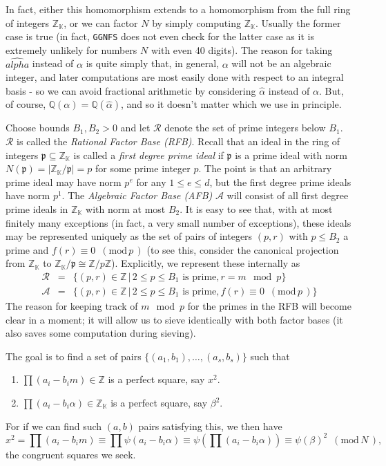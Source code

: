 \documentclass[12pt]{article}
\newcommand{\K}{\mathbb{K}}
\newcommand{\Z}{\mathbb{Z}}
\newcommand{\Q}{\mathbb{Q}}
\newcommand{\rfb}{\mathcal{R}}
\newcommand{\afb}{\mathcal{A}}
\newcommand{\p}{\mathfrak{p}}
\newcommand{\md}[1]{\,\,\, ( \mathrm{mod}\, #1 \,) }
\begin{document}
  In fact, either this homomorphism extends to a homomorphism
  from the full ring of integers $\Z_\K$, or we can factor
  $N$ by simply computing $\Z_\K$. Usually the former case is
  true (in fact, {\tt GGNFS} does not even check for the latter
  case as it is extremely unlikely for numbers $N$ with even 40
  digits). The reason for taking $\hat{alpha}$ instead of $\alpha$
  is quite simply that, in general, $\alpha$ will not be an algebraic
  integer, and later computations are most easily done with respect
  to an integral basis - so we can avoid fractional arithmetic
  by considering $\hat{\alpha}$ instead of $\alpha$.
  But, of course, $\Q(\alpha)=\Q(\hat{\alpha})$, and so it doesn't
  matter which we use in principle.



  Choose bounds $B_1, B_2 > 0$ and let $\rfb$ denote the set
  of prime integers below $B_1$. $\rfb$ is called the 
  {\em Rational Factor Base (RFB)}. Recall that an ideal
  in the ring of integers $\p\subseteq \Z_\K$ is called
  a {\em first degree prime ideal} if $\p$ is a prime
  ideal with norm $N(\p) = \vert \Z_\K/\p \vert = p$ for some
  prime integer $p$. The point is that an arbitrary prime
  ideal may have norm $p^e$ for any $1\le e\le d$, but the
  first degree prime ideals have norm $p^1$. The 
  {\em Algebraic Factor Base (AFB)} $\afb$ will consist of
  all first degree prime ideals in $\Z_\K$ with norm at most
  $B_2$. It is easy to see that, with at most finitely many exceptions
  (in fact, a very small number of exceptions), these ideals
  may be represented uniquely as the set of pairs of integers
  $(p,r)$ with $p\le B_2$ a prime and $f(r)\equiv 0\md{p}$
  (to see this, consider the canonical projection from
  $\Z_\K$ to $\Z_\K/\p \cong \Z/p\Z$).
  Explicitly, we represent these internally as
  \begin{eqnarray}
    \rfb &=& \{ (p,r)\in\Z \,\vert\, 2\le p \le B_1 \mbox{ is prime}, r=m\mod p \}\\
    \afb &=& \{ (p,r)\in \Z \,\vert\, 2\le p \le B_1 \mbox{ is prime}, f(r)\equiv 0\md{p} \}
  \end{eqnarray}
  The reason for keeping track of $m\mod p$ for the primes in the RFB will
  become clear in a moment; it will allow us to sieve identically with both 
  factor bases (it also saves some computation during sieving).

  The goal is to find a set of pairs $\{(a_1, b_1),\ldots ,(a_s, b_s)\}$
  such that
  \begin{enumerate}
    \item
      $\prod(a_i - b_im)\in\Z$ is a perfect square, say $x^2$.
    \item
      $\prod(a_i - b_i\alpha)\in\Z_\K$ is a perfect square, say $\beta^2$.
  \end{enumerate}
  For if we can find such $(a,b)$ pairs satisfying this, we then have
  \[
    x^2 = \prod(a_i - b_im) \equiv \prod \psi(a_i-b_i\alpha)
                            \equiv \psi(\prod(a_i - b_i\alpha))
                            \equiv \psi(\beta)^2 \md{N},
  \]
  the congruent squares we seek.
\end{document}
